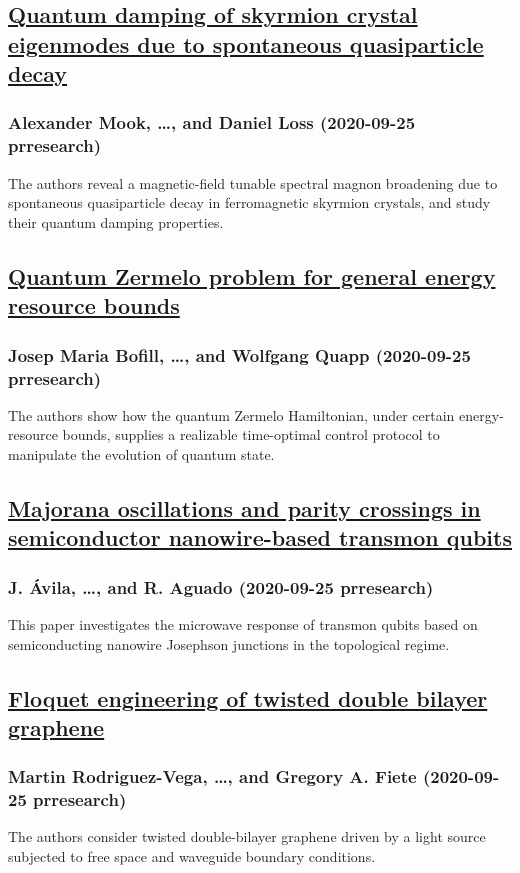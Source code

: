 \subsection*{\href{http://link.aps.org/doi/10.1103/PhysRevResearch.2.033491}{Quantum damping of skyrmion crystal eigenmodes due to spontaneous quasiparticle decay}}
\subsubsection*{Alexander Mook, \dots, and Daniel Loss (2020-09-25 prresearch)}
The authors reveal a magnetic-field tunable spectral magnon broadening due to spontaneous quasiparticle decay in ferromagnetic skyrmion crystals, and study their quantum damping properties.
\subsection*{\href{http://link.aps.org/doi/10.1103/PhysRevResearch.2.033492}{Quantum Zermelo problem for general energy resource bounds}}
\subsubsection*{Josep Maria Bofill, \dots, and Wolfgang Quapp (2020-09-25 prresearch)}
The authors show how the quantum Zermelo Hamiltonian, under certain energy-resource bounds, supplies a realizable time-optimal control protocol to manipulate the evolution of quantum state.
\subsection*{\href{http://link.aps.org/doi/10.1103/PhysRevResearch.2.033493}{Majorana oscillations and parity crossings in semiconductor nanowire-based transmon qubits}}
\subsubsection*{J. Ávila, \dots, and R. Aguado (2020-09-25 prresearch)}
This paper investigates the microwave response of transmon qubits based on semiconducting nanowire Josephson junctions in the topological regime.
\subsection*{\href{http://link.aps.org/doi/10.1103/PhysRevResearch.2.033494}{Floquet engineering of twisted double bilayer graphene}}
\subsubsection*{Martin Rodriguez-Vega, \dots, and Gregory A. Fiete (2020-09-25 prresearch)}
The authors consider twisted double-bilayer graphene driven by a light source subjected to free space and waveguide boundary conditions.
